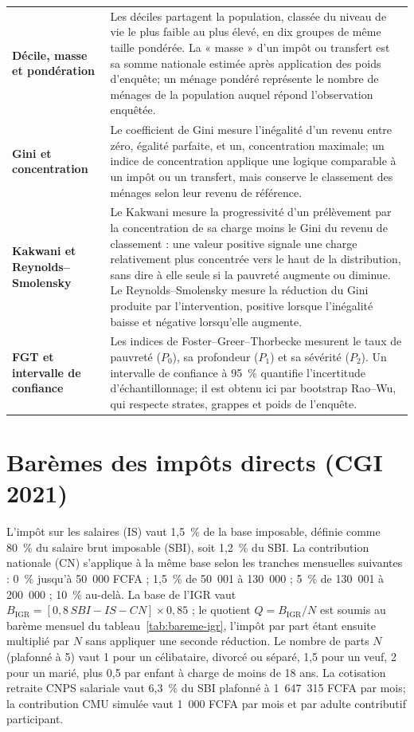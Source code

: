 \documentclass[11pt,a4paper]{article}
\begin{document}
\begin{longtable}{>{\RaggedRight\arraybackslash}p{}
                  >{\RaggedRight\arraybackslash}p{}}
\textbf{Décile, masse et pondération}
& Les déciles partagent la population, classée du niveau de vie le plus faible
au plus élevé, en dix groupes de même taille pondérée. La « masse » d'un impôt
ou transfert est sa somme nationale estimée après application des poids
d'enquête; un ménage pondéré représente le nombre de ménages de la population
auquel répond l'observation enquêtée. \\[0.35em]

\textbf{Gini et concentration}
& Le coefficient de Gini mesure l'inégalité d'un revenu entre zéro, égalité
parfaite, et un, concentration maximale; un indice de concentration applique une
logique comparable à un impôt ou un transfert, mais conserve le classement des
ménages selon leur revenu de référence. \\[0.35em]

\textbf{Kakwani et Reynolds--Smolensky}
& Le Kakwani mesure la progressivité d'un prélèvement par la concentration de sa
charge moins le Gini du revenu de classement : une valeur positive signale une
charge relativement plus concentrée vers le haut de la distribution, sans dire à
elle seule si la pauvreté augmente ou diminue. Le Reynolds--Smolensky mesure la
réduction du Gini produite par l'intervention, positive lorsque l'inégalité
baisse et négative lorsqu'elle augmente. \\[0.35em]

\textbf{FGT et intervalle de confiance}
& Les indices de Foster--Greer--Thorbecke mesurent le taux de pauvreté
($P_0$), sa profondeur ($P_1$) et sa sévérité ($P_2$). Un intervalle de
confiance à 95~\% quantifie l'incertitude d'échantillonnage; il est obtenu ici
par bootstrap Rao--Wu, qui respecte strates, grappes et poids de l'enquête. \\
\end{longtable}


\section{Barèmes des impôts directs (CGI 2021)}
\label{annexe:baremes}

L'impôt sur les salaires (IS) vaut 1,5~\% de la base imposable, définie comme
80~\% du salaire brut imposable (SBI), soit 1,2~\% du SBI. La contribution
nationale (CN) s'applique à la même base selon les tranches mensuelles
suivantes : 0~\% jusqu'à 50~000 FCFA ; 1,5~\% de 50~001 à 130~000 ; 5~\% de
130~001 à 200~000 ; 10~\% au-delà. La base de l'IGR vaut
$B_{\mathrm{IGR}} = [0{,}8\,SBI - IS - CN]\times0{,}85$ ; le quotient
$Q = B_{\mathrm{IGR}}/N$ est soumis au barème
mensuel du tableau~\ref{tab:bareme-igr}, l'impôt par part étant ensuite
multiplié par $N$ sans appliquer une seconde réduction. Le nombre de parts $N$ (plafonné à 5)
vaut 1 pour un célibataire, divorcé ou séparé, 1,5 pour un veuf, 2 pour un
marié, plus 0,5 par enfant à charge de moins de 18 ans. La cotisation retraite
CNPS salariale vaut
6,3~\% du SBI plafonné à 1~647~315 FCFA par mois; la contribution CMU simulée
vaut 1~000 FCFA par mois et par adulte contributif participant.
\end{document}
